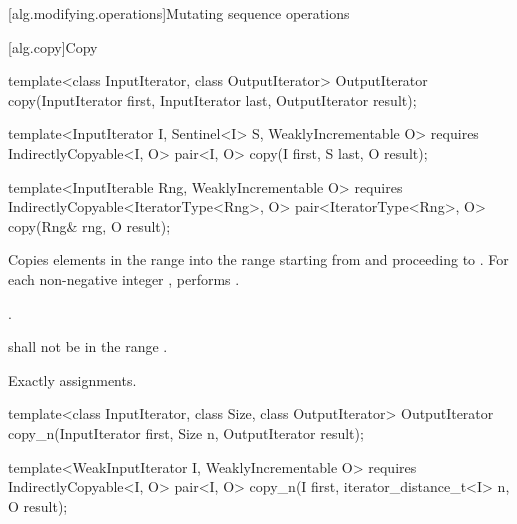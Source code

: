 [alg.modifying.operations]{Mutating sequence operations}

[alg.copy]{Copy}

%
\begin{removedblock}
\begin{itemdecl}
template<class InputIterator, class OutputIterator>
  OutputIterator copy(InputIterator first, InputIterator last,
                      OutputIterator result);
\end{itemdecl}
\end{removedblock}
\begin{addedblock}
\begin{itemdecl}
template<InputIterator I, Sentinel<I> S, WeaklyIncrementable O>
  requires IndirectlyCopyable<I, O>
  pair<I, O>
    copy(I first, S last, O result);

template<InputIterable Rng, WeaklyIncrementable O>
  requires IndirectlyCopyable<IteratorType<Rng>, O>
  pair<IteratorType<Rng>, O>
    copy(Rng& rng, O result);
\end{itemdecl}
\end{addedblock}

\begin{itemdescr}
\pnum
\effects Copies elements in the range  into the range
 starting from  and
proceeding to . For each non-negative integer
, performs .

\pnum
\returns {}.

\pnum
\requires {} shall not be in the range .

\pnum
\complexity Exactly  assignments.
\end{itemdescr}

%
\begin{removedblock}
\begin{itemdecl}
template<class InputIterator, class Size, class OutputIterator>
  OutputIterator copy_n(InputIterator first, Size n,
                        OutputIterator result);
\end{itemdecl}
\end{removedblock}
\begin{addedblock}
\begin{itemdecl}
template<WeakInputIterator I, WeaklyIncrementable O>
  requires IndirectlyCopyable<I, O>
  pair<I, O>
    copy_n(I first, iterator_distance_t<I> n, O result);
\end{itemdecl}
\end{addedblock}


